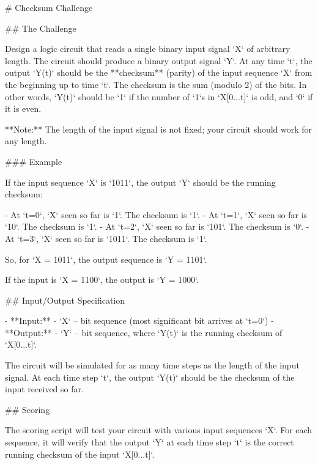 # Checksum Challenge

## The Challenge

Design a logic circuit that reads a single binary input signal `X` of arbitrary length. The circuit should produce a binary output signal `Y`. At any time `t`, the output `Y(t)` should be the **checksum** (parity) of the input sequence `X` from the beginning up to time `t`. The checksum is the sum (modulo 2) of the bits. In other words, `Y(t)` should be `1` if the number of `1`s in `X[0...t]` is odd, and `0` if it is even.

**Note:** The length of the input signal is not fixed; your circuit should work for any length.

### Example

If the input sequence `X` is `1011`, the output `Y` should be the running checksum:

- At `t=0`, `X` seen so far is `1`. The checksum is `1`.
- At `t=1`, `X` seen so far is `10`. The checksum is `1`.
- At `t=2`, `X` seen so far is `101`. The checksum is `0`.
- At `t=3`, `X` seen so far is `1011`. The checksum is `1`.

So, for `X = 1011`, the output sequence is `Y = 1101`.

If the input is `X = 1100`, the output is `Y = 1000`.

## Input/Output Specification

- **Input:**
  - `X` – bit sequence (most significant bit arrives at `t=0`)
- **Output:**
  - `Y` – bit sequence, where `Y(t)` is the running checksum of `X[0...t]`.

The circuit will be simulated for as many time steps as the length of the input signal. At each time step `t`, the output `Y(t)` should be the checksum of the input received so far.

## Scoring

The scoring script will test your circuit with various input sequences `X`. For each sequence, it will verify that the output `Y` at each time step `t` is the correct running checksum of the input `X[0...t]`.
